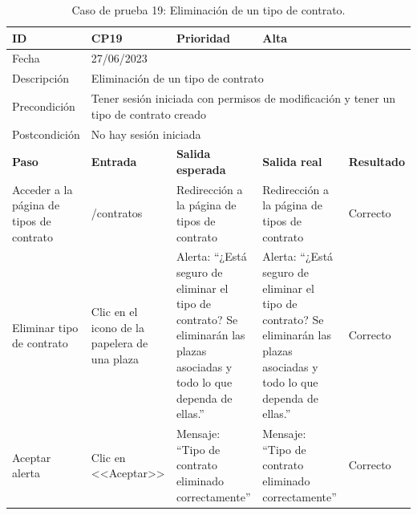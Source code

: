 \begin{table}[H]
\small
\begin{tabular}{p{} p{} p{} p{} p{}}
\cellcolor{gray!25}
ID   & CP19 & \cellcolor{gray!25} Prioridad   & Alta \\ \hline
\cellcolor{gray!25} Fecha	&	\multicolumn{4}{l}{27/06/2023} \\ \hline
\cellcolor{gray!25} Descripción		&	\multicolumn{4}{l}{Eliminación de un tipo de contrato} \\ \hline                                            
\cellcolor{gray!25}
Precondición  & \multicolumn{4}{p{.66\textwidth}}{Tener sesión iniciada con permisos de modificación y tener un tipo de contrato creado} \\ \hline
\cellcolor{gray!25} Postcondición & \multicolumn{4}{l}{No hay sesión iniciada}                                                    \\ \hline
\rowcolor{gray!25}
\textbf{Paso}   & \textbf{Entrada} & \textbf{Salida esperada} & \textbf{Salida real} & \textbf{Resultado} \\ \hline
Acceder a la página de tipos de contrato 
& /contratos                                                                          
& Redirección a la página de tipos de contrato                                    
& Redirección a la página de tipos de contrato                                    
& Correcto                            
\\ \hline
Eliminar tipo de contrato
& Clic en el icono de la papelera de una plaza
& Alerta: ``¿Está seguro de eliminar el tipo de contrato? Se eliminarán las plazas asociadas y todo lo que dependa de ellas.''
& Alerta: ``¿Está seguro de eliminar el tipo de contrato? Se eliminarán las plazas asociadas y todo lo que dependa de ellas.''
& Correcto
\\ \hline
Aceptar alerta
& Clic en <<Aceptar>>
& Mensaje: ``Tipo de contrato eliminado correctamente'' 
& Mensaje: ``Tipo de contrato eliminado correctamente'' 
& Correcto
\\ \hline             
\end{tabular}
\caption{Caso de prueba 19: Eliminación de un tipo de contrato.}\label{table:CP19}
\end{table}

